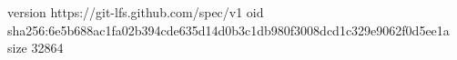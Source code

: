 version https://git-lfs.github.com/spec/v1
oid sha256:6e5b688ac1fa02b394cde635d14d0b3c1db980f3008dcd1c329e9062f0d5ee1a
size 32864
